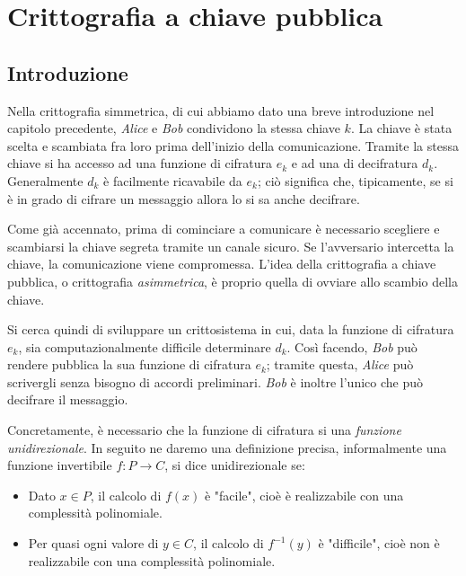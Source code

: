%
%
\chapter{Crittografia a chiave pubblica}
\section{Introduzione}

	Nella crittografia simmetrica, di cui abbiamo dato una breve introduzione nel capitolo precedente, \emph{Alice} e \emph{Bob} condividono la stessa chiave \(k\).
	La chiave è stata scelta e scambiata fra loro prima dell'inizio della comunicazione.
	Tramite la stessa chiave si ha accesso ad una funzione di cifratura \(e_k\) e ad una di decifratura \(d_k\).
	Generalmente \(d_k\) è facilmente ricavabile da \(e_k\); ciò significa che, tipicamente, se si è in grado di cifrare un messaggio allora lo si sa anche decifrare.

	Come già accennato, prima di cominciare a comunicare è necessario scegliere e scambiarsi la chiave segreta tramite un canale sicuro. Se l'avversario intercetta la chiave, la comunicazione viene compromessa.
	L'idea della crittografia a chiave pubblica, o crittografia \emph{asimmetrica}, è proprio quella di ovviare allo scambio della chiave.

	Si cerca quindi di sviluppare un crittosistema in cui, data la funzione di cifratura \(e_k\), sia computazionalmente difficile determinare \(d_k\).
	Così facendo, \emph{Bob} può rendere pubblica la sua funzione di cifratura \(e_k\); tramite questa, \emph{Alice} può scrivergli senza bisogno di accordi preliminari.
	\emph{Bob} è inoltre l'unico che può decifrare il messaggio.

	Concretamente, è necessario che la funzione di cifratura si una \emph{funzione unidirezionale}.
	In seguito ne daremo una definizione precisa, informalmente una funzione invertibile \(f\colon P \to C\), si dice unidirezionale se:
	\begin{itemize}
		\item Dato \(x\in P\), il calcolo di \(f(x)\) è "facile", cioè è realizzabile con una complessità polinomiale.
		\item Per quasi ogni valore di \(y\in C\), il calcolo di \(f^{-1}(y)\) è "difficile", cioè non è realizzabile con una complessità polinomiale.
	\end{itemize}

